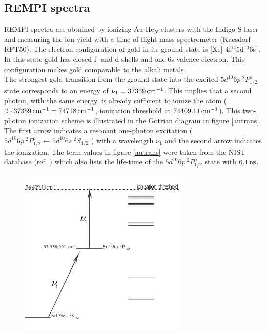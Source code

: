 \documentclass[parskip,12pt,headsepline,a4paper] {scrbook}
\begin{document}
\subsection{REMPI spectra}
\label{chap:aurempi}
\vspace{-1\baselineskip}
REMPI spectra are obtained by ionizing Au-He$_N$ clusters with the Indigo-S laser and measuring the ion yield with a time-of-flight mass spectrometer (Kaesdorf RFT50). The electron configuration of gold in its ground state is [Xe] 4f$^{14}$5d$^{10}$6s$^1$. In this state gold has closed f- and d-shells and one 6s valence electron. This configuration makes gold comparable to the alkali metals. \\
The strongest gold transition from the ground state into the excited $5d^{10} 6p \ ^2P^o_{1/2}$ state corresponds to an energy of $\nu_1 = \unit[37 359]{cm^{-1}}$. This implies that a second photon, with the same energy, is already sufficient to ionize the atom ($2 \cdot \unit[37 359]{cm^{-1}} = \unit[74 718]{cm^{-1}}$, ionization threshold at $\unit[74 409.11]{cm^{-1}}$). This two-photon ionization scheme is illustrated in the Gotrian diagram in figure \ref{autrans}. The first arrow indicates a resonant one-photon excitation ($5d^{10}6p \ ^2P^o_{1/2} \leftarrow 5d^{10}6s \ ^2S_{1/2}$ ) with a wavelength $\nu_1$ and the second arrow indicates the ionization. The term values in figure \ref{autrans} were taken from the NIST database (ref. \cite{nist}) which also lists the life-time of the $5d^{10} 6p \ ^2P^o_{1/2}$ state with $\unit[6.1]{ns}$.

\begin{figure}[ht]
\centerline{
\includegraphics[width=8cm]{./results/au_trans_simple.jpg}}
\end{figure}
\end{document}
